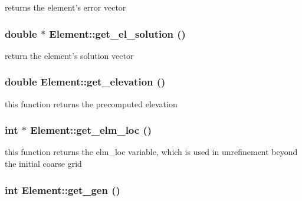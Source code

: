 returns the element's error vector 

\hypertarget{classElement_a26}{
\subsubsection[get\_\-el\_\-solution]{\setlength{\rightskip}{0pt plus 5cm}double $\ast$ Element::get\_\-el\_\-solution ()}}
\label{classElement_a26}


return the element's solution vector 

\hypertarget{classElement_a89}{
\subsubsection[get\_\-elevation]{\setlength{\rightskip}{0pt plus 5cm}double Element::get\_\-elevation ()}}
\label{classElement_a89}


this function returns the precomputed elevation 

\hypertarget{classElement_a101}{
\subsubsection[get\_\-elm\_\-loc]{\setlength{\rightskip}{0pt plus 5cm}int $\ast$ Element::get\_\-elm\_\-loc ()}}
\label{classElement_a101}


this function returns the elm\_\-loc variable, which is used in unrefinement beyond the initial coarse grid 

\hypertarget{classElement_a31}{
\subsubsection[get\_\-gen]{\setlength{\rightskip}{0pt plus 5cm}int Element::get\_\-gen ()}}
\label{classElement_a31}


